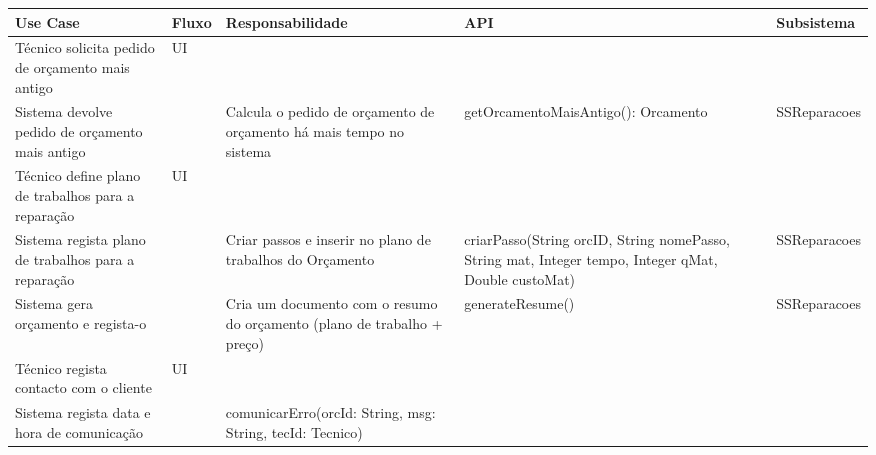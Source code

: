 \documentclass[../relatorio.tex]{subfiles}
\begin{document}
\begin{landscape}
    \begin{table}[!h]
        \centering
        \begin{tabular}{|p{5cm}|p{1cm}|p{4cm}|p{6cm}|p{3cm}|}
            \hline
            \rowcolor{gray!20!white}
            Use Case & Fluxo & Responsabilidade & API & Subsistema \\
            \hline
            \rowcolor{yellow}
            Técnico solicita pedido de orçamento mais antigo
                     & 
            UI
                     & 
                     & 
                     & 
            \\
            \hline
            Sistema devolve pedido de orçamento mais antigo
                     & 
                     & 
            Calcula o pedido de orçamento de orçamento há mais tempo no sistema
                     & 
            getOrcamentoMaisAntigo(): Orcamento
                     & 
            SSReparacoes
            \\
            \hline
            \rowcolor{yellow}
            Técnico define plano de trabalhos para a reparação
                     & 
            UI 
                     & 
                     & 
                     & 
            \\
            \hline
            Sistema regista plano de trabalhos para a reparação
                     & 
                     & 
            Criar passos e inserir no plano de trabalhos do Orçamento
                     & 
            criarPasso(String orcID, String nomePasso, String mat, Integer tempo, Integer qMat, Double custoMat)
                     & 
            SSReparacoes
            \\
            \hline
            Sistema gera orçamento e regista-o
                     & 
                     & 
            Cria um documento com o resumo do orçamento (plano de trabalho + preço)
                     & 
            generateResume()
                     & 
            SSReparacoes
            \\
            \hline
            \rowcolor{yellow}
            Técnico regista contacto com o cliente
                    & UI
                    &
                    &
                    &
            \\
            \hline
            Sistema regista data e hora de comunicação
                     & 
                     & 
            comunicarErro(orcId: String, msg: String, tecId: Tecnico)
                     & 

\end{tabular}
\end{table}
\end{landscape}
\end{document}
